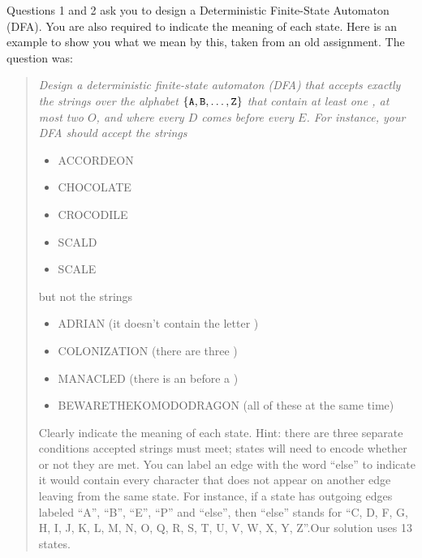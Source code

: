 Questions 1 and 2 ask you to design a Deterministic Finite-State Automaton (DFA). You are also required to indicate the meaning of each state. Here is an example to show you what we mean by this, taken from an old assignment. The question was:

\begin{quote}
\it
  Design a  deterministic finite-state  automaton (DFA) that  accepts exactly  the strings
  over the alphabet $\{ \verb@A@, \verb@B@, \ldots, \verb@Z@ \}$ that contain at least one
  \verb@C@, at  most two $O$, and  where every $D$  comes before every $E$.  For instance,
  your DFA should accept the strings
  \begin{itemize}
  \item ACCORDEON
  \item CHOCOLATE
  \item CROCODILE
  \item SCALD
  \item SCALE
  \end{itemize}
  but not the strings
  \begin{itemize}
  \item ADRIAN (it doesn't contain the letter \verb@C@)
  \item COLONIZATION (there are three \verb@O@s)
  \item MANACLED (there is an \verb@E@ before a \verb@D@)
  \item BEWARETHEKOMODODRAGON (all of these at the same time)
  \end{itemize}
  Clearly indicate  the meaning of each  state. Hint: there are  three separate conditions
  accepted strings must meet; states will need to  encode whether or not they are met. You can label an edge with the word ``else'' to indicate it would contain every character that does not appear on another edge leaving from the same state. For instance, if a state has outgoing edges labeled ``A'', ``B'', ``E'', ``P'' and ``else'', then ``else'' stands for ``C, D, F, G, H, I, J, K, L, M, N, O, Q, R, S, T, U, V, W, X, Y, Z''.Our
  solution uses 13 states.
\end{quote}

